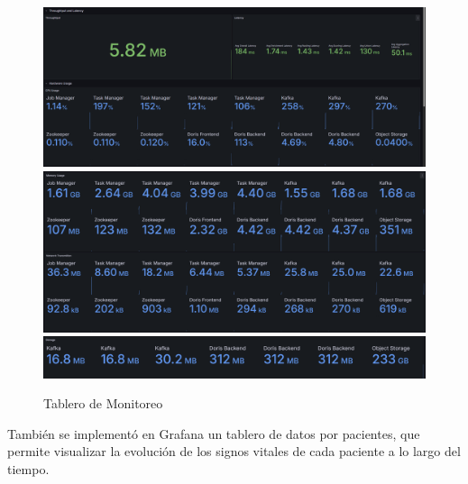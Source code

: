 \begin{figure}[h]
    \centering
    \includegraphics[width=1\textwidth]{desarrollo/monitoring1.png}
    \includegraphics[width=1\textwidth]{desarrollo/monitoring2.png}
    \includegraphics[width=1\textwidth]{desarrollo/monitoring3.png}
    \caption{Tablero de Monitoreo}
    \label{fig:monitoring}
\end{figure}
\clearpage

También se implementó en Grafana un tablero de datos por pacientes, que permite visualizar la evolución de los signos vitales de cada paciente a lo largo del tiempo.

